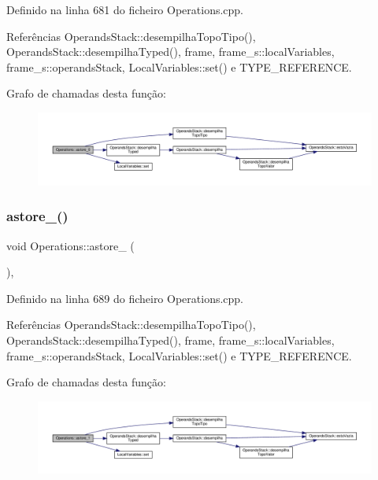 Definido na linha 681 do ficheiro Operations.\+cpp.



Referências Operands\+Stack\+::desempilha\+Topo\+Tipo(), Operands\+Stack\+::desempilha\+Typed(), frame, frame\+\_\+s\+::local\+Variables, frame\+\_\+s\+::operands\+Stack, Local\+Variables\+::set() e T\+Y\+P\+E\+\_\+\+R\+E\+F\+E\+R\+E\+N\+CE.

Grafo de chamadas desta função\+:\nopagebreak
\begin{figure}[H]
\begin{center}
\leavevmode
\includegraphics[width=350pt]{classOperations_a140f2e8501424f8a73dbfecfa3ca859f_cgraph}
\end{center}
\end{figure}
\mbox{\label{classOperations_a1a7a41be018313dd524df5327c8b6035}} 
\subsubsection{\texorpdfstring{astore\+\_()}{astore\_1()}}
{\footnotesize\ttfamily void Operations\+::astore\+\_ (\begin{DoxyParamCaption}{ }\end{DoxyParamCaption})\hspace{0.3cm}{\ttfamily [static]}, {\ttfamily [private]}}



Definido na linha 689 do ficheiro Operations.\+cpp.



Referências Operands\+Stack\+::desempilha\+Topo\+Tipo(), Operands\+Stack\+::desempilha\+Typed(), frame, frame\+\_\+s\+::local\+Variables, frame\+\_\+s\+::operands\+Stack, Local\+Variables\+::set() e T\+Y\+P\+E\+\_\+\+R\+E\+F\+E\+R\+E\+N\+CE.

Grafo de chamadas desta função\+:\nopagebreak
\begin{figure}[H]
\begin{center}
\leavevmode
\includegraphics[width=350pt]{classOperations_a1a7a41be018313dd524df5327c8b6035_cgraph}
\end{center}
\end{figure}
\mbox{\label{classOperations_a01e238bbea0f9d61d80a8fcd3ed2f660}} 
